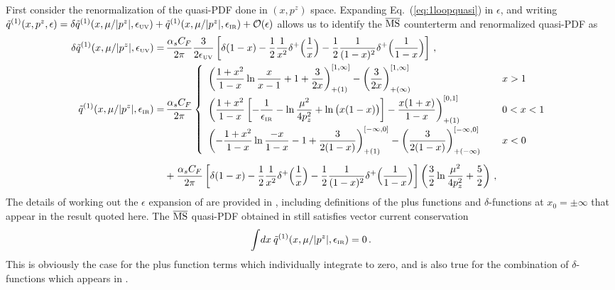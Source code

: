 \begin{widetext}
First consider the renormalization of the quasi-PDF done in $(x,p^z)$ space. Expanding Eq.~(\ref{eq:1loopquasi}) in $\epsilon$, and writing $\tilde{q}^{(1)}(x,p^z,\epsilon) =\delta \tilde{q}^{(1)}(x,\mu/|p^z|,\epsilon_{\mbox{\tiny UV}})+\tilde{q}^{(1)}(x,\mu/|p^z|,\epsilon_{\mbox{\tiny IR}}) +{\cal O}(\epsilon)$ allows us to identify the $\overline{\rm MS}$ counterterm and renormalized quasi-PDF as
\begin{align}\label{eq:qPDFren}
\delta \tilde{q}^{(1)}(x,\mu/|p^z|,\epsilon_{\mbox{\tiny UV}})
=&\,  {\alpha_sC_F\over 2\pi} {3\over 2\epsilon_{\mbox{\tiny UV}}}
 \left[\delta(1-x) - {1\over2}{1\over x^2}\delta^+\Big({1\over x}\Big) - {1\over2}{1\over (1-x)^2}\delta^+\Big({1\over 1-x}\Big) \right]
 \,, \\
\tilde{q}^{(1)}(x,\mu/|p^z|,\epsilon_{\mbox{\tiny IR}})
=&\, {\alpha_sC_F\over 2\pi}\left\{
\begin{array}{ll}
\displaystyle \left({1+x^2\over 1-x}\ln {x\over x-1} + 1 + {3\over 2x}\right)^{[1,\infty]}_{+(1)}- \left({3\over 2x}\right)^{[1,\infty]}_{+(\infty)} &\, x>1\\[10pt]
\displaystyle \left({1+x^2\over 1-x}\left[- {1\over \epsilon_{\mbox{\tiny IR}}} - \ln{\mu^2\over 4p_z^2} + \ln\big(x(1-x)\big)\right] - {x(1+x)\over 1-x}\right)^{[0,1]}_{+(1)}  &\, 0<x<1\\[10pt]
\displaystyle  \left(-{1+x^2\over 1-x}\ln {-x\over 1-x} - 1 + {3\over 2(1-x)}\right)^{[-\infty,0]}_{+(1)} - \left({3\over 2(1-x)}\right)^{[-\infty,0]}_{+(-\infty)} \quad &\, x<0
\end{array}\right.\nonumber\\[5pt]
& + {\alpha_sC_F\over 2\pi}\left[\delta(1-x) - {1\over2}{1\over x^2}\delta^+\Big({1\over x}\Big) - {1\over2}{1\over (1-x)^2}\delta^+\Big({1\over 1-x}\Big) \right] \left( {3\over2}\ln{\mu^2\over 4p_z^2} + {5\over2}\right)
 \,,\nonumber
\end{align}
The details of working out the $\epsilon$ expansion of  are provided in , including definitions of the plus functions and $\delta$-functions at $x_0=\pm \infty$ that appear in the result quoted here. The $\overline{\rm MS}$ quasi-PDF obtained in  still satisfies vector current conservation
\begin{align} \label{eq:qpdfconsrv}
 \int\! dx\: \tilde{q}^{(1)}(x,\mu/|p^z|,\epsilon_{\mbox{\tiny IR}})  =0 \,.
\end{align}
This is obviously the case for the plus function terms which individually integrate to zero, and is also true for the combination of $\delta$-functions which appears in .


\end{widetext}
